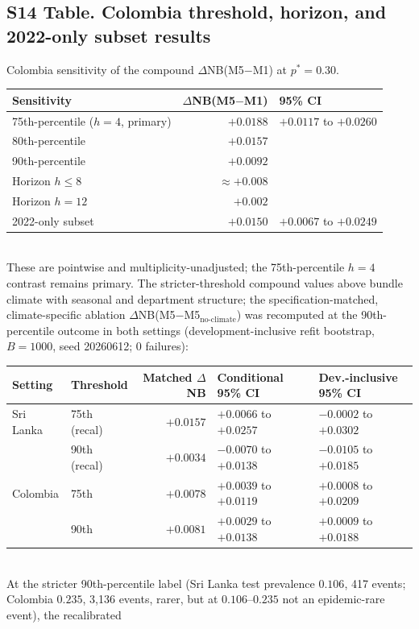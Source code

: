 \documentclass[11pt,a4paper]{article}
\begin{document}
\subsection*{S14 Table. Colombia threshold, horizon, and 2022-only subset results}
\noindent Colombia sensitivity of the compound $\Delta$NB(M5$-$M1) at $p^*=0.30$.\\[0.3em]
{\footnotesize\begin{tabular}{@{}lrl@{}}
\toprule
Sensitivity & $\Delta$NB(M5$-$M1) & 95\% CI \\
\midrule
75th-percentile ($h=4$, primary) & $+0.0188$ & $+0.0117$ to $+0.0260$ \\
80th-percentile & $+0.0157$ & \\
90th-percentile & $+0.0092$ & \\
Horizon $h\le 8$ & $\approx+0.008$ & \\
Horizon $h=12$ & $+0.002$ & \\
2022-only subset & $+0.0150$ & $+0.0067$ to $+0.0249$ \\
\bottomrule
\end{tabular}}\\[0.3em]
These are pointwise and multiplicity-unadjusted; the 75th-percentile $h=4$ contrast
remains primary. The stricter-threshold compound values above bundle climate with seasonal and
department structure; the specification-matched, climate-specific ablation
$\Delta$NB(M5$-$M5$_{\text{no-climate}}$) was recomputed at the 90th-percentile outcome in both
settings (development-inclusive refit bootstrap, $B=1000$, seed 20260612; 0 failures):\\[0.3em]
{\footnotesize\begin{tabular}{@{}llrll@{}}
\toprule
Setting & Threshold & Matched $\Delta$NB & Conditional 95\% CI & Dev.-inclusive 95\% CI \\
\midrule
Sri Lanka & 75th (recal) & $+0.0157$ & $+0.0066$ to $+0.0257$ & $-0.0002$ to $+0.0302$ \\
 & 90th (recal) & $+0.0034$ & $-0.0070$ to $+0.0138$ & $-0.0105$ to $+0.0185$ \\
Colombia & 75th & $+0.0078$ & $+0.0039$ to $+0.0119$ & $+0.0008$ to $+0.0209$ \\
 & 90th & $+0.0081$ & $+0.0029$ to $+0.0138$ & $+0.0009$ to $+0.0188$ \\
\bottomrule
\end{tabular}}\\[0.3em]
At the stricter 90th-percentile label (Sri Lanka test prevalence $0.106$, 417 events; Colombia
$0.235$, 3{,}136 events, rarer, but at $0.106$--$0.235$ not an epidemic-rare event), the recalibrated
\end{document}
